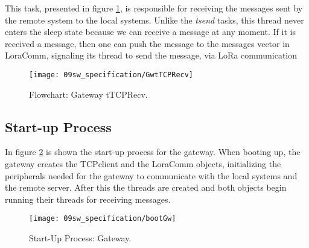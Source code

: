 %
%
%

This task, presented in figure \ref{fig:gwtTCPRecv}, is responsible for receiving the messages sent by the remote system to the local systems. Unlike the \textit{tsend} tasks, this thread never enters the sleep state because we can receive a message at any moment. If it is received a message, then one can push the message to the messages vector in LoraComm, signaling its thread to send the message, via LoRa communication

\begin{figure}[H]
	\centering
	\texttt{[image: 09sw\_specification/GwtTCPRecv]}
	\caption{Flowchart: Gateway tTCPRecv.}
	\label{fig:gwtTCPRecv}
\end{figure}

\clearpage
\subsection{Start-up Process}
In figure \ref{fig:bootGateway} is shown the start-up process for the gateway. When booting up, the gateway creates the TCPclient and the LoraComm objects, initializing the peripherals needed for the gateway to communicate with the local systems and the remote server. After this the threads are created and both objects begin running their threads for receiving messages.

\begin{figure}[H]
	\centering
	\texttt{[image: 09sw\_specification/bootGw]}
	\caption{Start-Up Process: Gateway.}
	\label{fig:bootGateway}
\end{figure}


